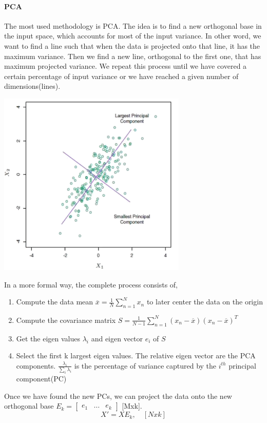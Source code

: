 \documentclass[main.tex]{subfiles}
\begin{document}
\paragraph{PCA} The most used methodology is PCA. The idea is to find a new orthogonal base in the input space, which accounts for most of the input variance. In other word, we want to find a line such that when the data is projected onto that line, it has the maximum variance. Then we find a new line, orthogonal to the first one, that has maximum projected variance. We repeat this process until we have covered a certain percentage of input variance or we have reached a given number of dimensions(lines).
\begin{center}
    \includegraphics[width=90mm]{img/PCA.png} \\
\end{center}
In a more formal way, the complete process consists of,
\begin{enumerate}
    \item Compute the data mean $\overline{x} = \frac{1}{N} \sum_{n=1}^N x_n$ to later center the data on the origin
    \item Compute the covariance matrix $S = \frac{1}{N-1} \sum_{n=1}^N (x_n-\overline{x})(x_n-\overline{x})^T$
    \item Get the eigen values $\lambda_i$ and eigen vector $e_i$ of $S$
    \item Select the first k largest eigen values. The relative eigen vector are the PCA components. $\frac{\lambda_i}{\sum_i \lambda_i}$ is the percentage of variance captured by the $i^{th}$ principal component(PC)
\end{enumerate}
Once we have found the new PCs, we can project the data onto the new orthogonal base $E_k = \begin{bmatrix} e_1 & \dots & e_k \end{bmatrix}$ [Mxk].
\begin{equation}
    X'=XE_k, \quad [Nxk]
\end{equation}
\end{document}
